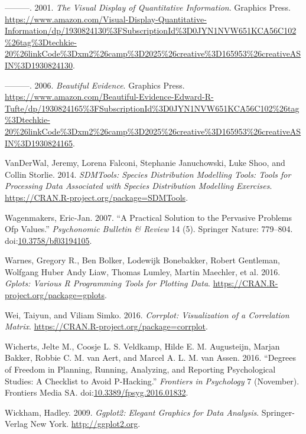 \documentclass[12pt,]{book}
\begin{document}
\hypertarget{ref-1930824130}{}
---------. 2001. \emph{The Visual Display of Quantitative Information}.
Graphics Press.
\url{https://www.amazon.com/Visual-Display-Quantitative-Information/dp/1930824130\%3FSubscriptionId\%3D0JYN1NVW651KCA56C102\%26tag\%3Dtechkie-20\%26linkCode\%3Dxm2\%26camp\%3D2025\%26creative\%3D165953\%26creativeASIN\%3D1930824130}.

\hypertarget{ref-1930824165}{}
---------. 2006. \emph{Beautiful Evidence}. Graphics Press.
\url{https://www.amazon.com/Beautiful-Evidence-Edward-R-Tufte/dp/1930824165\%3FSubscriptionId\%3D0JYN1NVW651KCA56C102\%26tag\%3Dtechkie-20\%26linkCode\%3Dxm2\%26camp\%3D2025\%26creative\%3D165953\%26creativeASIN\%3D1930824165}.

\hypertarget{ref-R-SDMTools}{}
VanDerWal, Jeremy, Lorena Falconi, Stephanie Januchowski, Luke Shoo, and
Collin Storlie. 2014. \emph{SDMTools: Species Distribution Modelling
Tools: Tools for Processing Data Associated with Species Distribution
Modelling Exercises}. \url{https://CRAN.R-project.org/package=SDMTools}.

\hypertarget{ref-Wagenmakers2007}{}
Wagenmakers, Eric-Jan. 2007. ``A Practical Solution to the Pervasive
Problems Ofp Values.'' \emph{Psychonomic Bulletin \& Review} 14 (5).
Springer Nature: 779--804.
doi:\href{https://doi.org/10.3758/bf03194105}{10.3758/bf03194105}.

\hypertarget{ref-R-gplots}{}
Warnes, Gregory R., Ben Bolker, Lodewijk Bonebakker, Robert Gentleman,
Wolfgang Huber Andy Liaw, Thomas Lumley, Martin Maechler, et al. 2016.
\emph{Gplots: Various R Programming Tools for Plotting Data}.
\url{https://CRAN.R-project.org/package=gplots}.

\hypertarget{ref-R-corrplot}{}
Wei, Taiyun, and Viliam Simko. 2016. \emph{Corrplot: Visualization of a
Correlation Matrix}. \url{https://CRAN.R-project.org/package=corrplot}.

\hypertarget{ref-Wicherts2016}{}
Wicherts, Jelte M., Coosje L. S. Veldkamp, Hilde E. M. Augusteijn,
Marjan Bakker, Robbie C. M. van Aert, and Marcel A. L. M. van Assen.
2016. ``Degrees of Freedom in Planning, Running, Analyzing, and
Reporting Psychological Studies: A Checklist to Avoid P-Hacking.''
\emph{Frontiers in Psychology} 7 (November). Frontiers Media SA.
doi:\href{https://doi.org/10.3389/fpsyg.2016.01832}{10.3389/fpsyg.2016.01832}.

\hypertarget{ref-R-ggplot2}{}
Wickham, Hadley. 2009. \emph{Ggplot2: Elegant Graphics for Data
Analysis}. Springer-Verlag New York. \url{http://ggplot2.org}.
\end{document}
